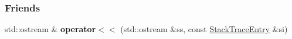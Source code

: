 \subsubsection*{Friends}
\begin{DoxyCompactItemize}
\item 
\hypertarget{a00083_ae393cfa1f102a32239d485892c659862}{}std\+::ostream \& {\bfseries operator$<$$<$} (std\+::ostream \&ss, const \hyperlink{a00083}{Stack\+Trace\+Entry} \&si)\label{a00083_ae393cfa1f102a32239d485892c659862}

\end{DoxyCompactItemize}
